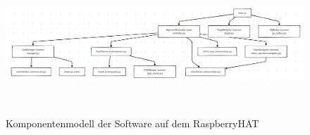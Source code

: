\documentclass[main.tex]{subfiles} %
\begin{document}
\begin{figure}[H]
    \centering
    \includegraphics[width = 0.9\linewidth]{./Informatik_subfiles/fig_Informatik/diagram_not_fucked.png}
    \caption{Komponentenmodell der Software auf dem RaspberryHAT}~\label{fig:Komponentenmodell}
\end{figure}


\newpage


\newpage


\newpage


\newpage
\end{document}
